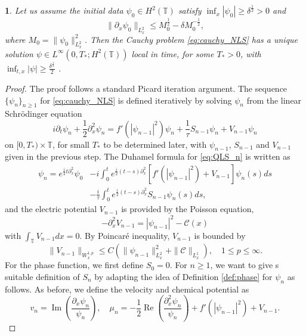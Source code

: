 \documentclass[leqno]{amsart}
\theoremstyle{plain}
\theoremstyle{definition}
\theoremstyle{remark}
\theoremstyle{plain}
\theoremstyle{plain}
\newtheorem{prop}[thm]{\protect\propositionname}
\providecommand{\propositionname}{Proposition}
\def\T{{\mathbb T}}%
\def\d{{\partial}}
\DeclareMathOperator{\RE}{Re}
\DeclareMathOperator{\IM}{Im}
\numberwithin{equation}{section}
\begin{document}
\begin{prop}
Let us assume the initial data $\psi_0\in H^2(\T)$ satisfy $\inf_x|\psi_0|\geq \delta^\frac12 >0$ and 
\begin{equation}\label{eq:ini_1}
\|\d_x\psi_0\|_{L^2_x} \leq M_0^\frac12-\delta M_0^{-\frac12},
\end{equation}
where $M_0=\|\psi_0\|_{L^2_x}^2$. Then the Cauchy problem \eqref{eq:cauchy_NLS} has a unique solution $\psi\in L^\infty(0,T_*;H^2(\T))$ local in time, for some $T_*>0$, with $\inf_{t,x}|\psi|\geq \frac{\delta^\frac12}{2}$ .
\end{prop}

\begin{proof}
The proof follows a standard Picard iteration argument. The sequence $\{\psi_n\}_{n\geq 1}$ for \eqref{eq:cauchy_NLS} is defined iteratively by solving $\psi_n$ from the linear Schr\"odinger equation 
\begin{equation}\label{eq:QLS_n}
i\d_t\psi_n+\frac12\d_x^2\psi_n=f'(|\psi_{n-1}|^2)\psi_n+\frac{1}{\tau}S_{n-1}\psi_n+V_{n-1}\psi_n
\end{equation}
on $[0,T_*)\times \T$, for small $T_*$ to be determined later, with $\psi_{n-1}$, $S_{n-1}$ and $V_{n-1}$ given in the previous step. The Duhamel formula for \eqref{eq:QLS_n} is written as
\begin{equation}\label{eq:duhamel}
\begin{aligned}
\psi_n=e^{\frac{i}{2}t\d_x^2}\psi_0&-i\int_0^te^{\frac{i}{2}(t-s)\d_x^2}[f'(|\psi_{n-1}|^2)+V_{n-1}]\psi_n(s)ds\\
&-\frac{i}{\tau}\int_0^te^{\frac{i}{2}(t-s)\d_x^2}S_{n-1}\psi_n(s)ds,
\end{aligned}
\end{equation}
and the electric potential $V_{n-1}$ is provided by the Poisson equation, 
\[
-\d_x^2 V_{n-1}=|\psi_{n-1}|^2-\mathcal{C}(x)
\]
with $\int_\T V_{n-1}dx=0$. By Poincar\'e inequality, $V_{n-1}$ is bounded by
\[
\|V_{n-1}\|_{W^{1,p}_x}\leq C(\|\psi_{n-1}\|^2_{L^2_x}+\|\mathcal{C}\|_{L^1_x}),\quad 1\leq p\leq \infty.
\]
For the phase function, we first define $S_0=0$. For $n\geq 1$, we want to give s suitable definition of $S_n$ by adapting the idea of Definition \ref{def:phase} for $\psi_n$ as follows. As before, we define the velocity and chemical potential as
\begin{equation}\label{eq:mu_n}
v_n=\IM\left(\frac{\d_x\psi_n}{\psi_n}\right),\quad \mu_n=-\frac12\RE\left(\frac{\d_x^2\psi_n}{\psi_n}\right)+f'(|\psi_{n-1}|^2)+V_{n-1}.
\end{equation}

\end{proof}
\end{document}
